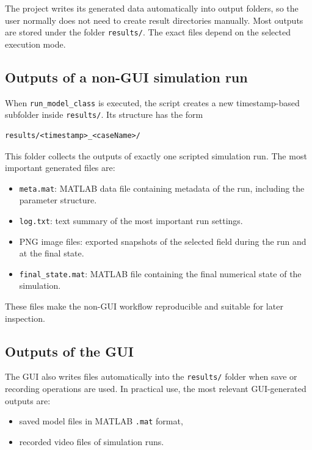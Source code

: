 The project writes its generated data automatically into output folders, so the user normally does not need to create result directories manually. Most outputs are stored under the folder \texttt{results/}. The exact files depend on the selected execution mode.

\subsection*{Outputs of a non-GUI simulation run}

When \texttt{run\_model\_class} is executed, the script creates a new timestamp-based subfolder inside \texttt{results/}. Its structure has the form

\begin{verbatim}
results/<timestamp>_<caseName>/
\end{verbatim}

This folder collects the outputs of exactly one scripted simulation run. The most important generated files are:

\begin{itemize}
    \item \texttt{meta.mat}: MATLAB data file containing metadata of the run, including the parameter structure.
    \item \texttt{log.txt}: text summary of the most important run settings.
    \item PNG image files: exported snapshots of the selected field during the run and at the final state.
    \item \texttt{final\_state.mat}: MATLAB file containing the final numerical state of the simulation.
\end{itemize}

These files make the non-GUI workflow reproducible and suitable for later inspection.

\subsection*{Outputs of the GUI}

The GUI also writes files automatically into the \texttt{results/} folder when save or recording operations are used. In practical use, the most relevant GUI-generated outputs are:

\begin{itemize}
    \item saved model files in MATLAB \texttt{.mat} format,
    \item recorded video files of simulation runs.
\end{itemize}

